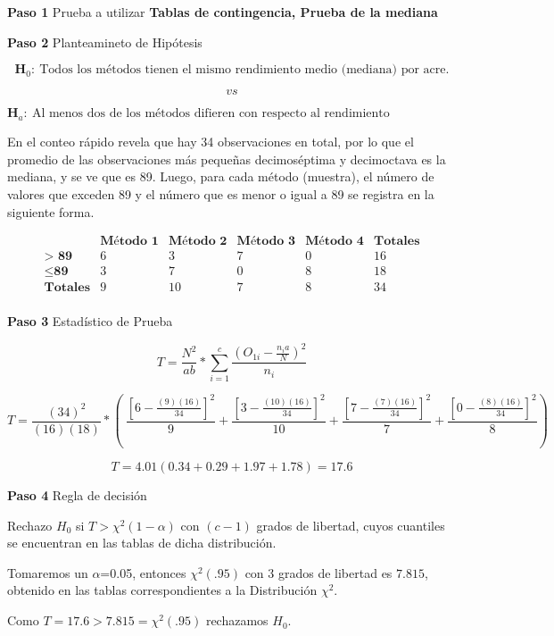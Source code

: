 \documentclass[
  a4paper,
  oneside,
  openany]{book}
\begin{document}
\textbf{Paso 1} Prueba a utilizar \textbf{Tablas de contingencia, Prueba de la mediana}

\textbf{Paso 2} Planteamineto de Hipótesis

\[\textbf{H}_0: \ \mbox{Todos los métodos tienen el mismo rendimiento medio (mediana) por acre.}\]

\[vs\]

\[\textbf{H}_a: \ \mbox{Al menos dos de los métodos difieren con respecto al rendimiento medio(mediana) por acre.}\]

En el conteo rápido revela que hay 34 observaciones en total, por lo que el promedio de las observaciones más pequeñas decimoséptima y decimoctava es la mediana, y se ve que es 89. Luego, para cada método (muestra), el número de valores que exceden 89 y el número que es menor o igual a 89 se registra en la siguiente forma.

\[
\begin{array}{c|c|c|c|c|c}
 & \textbf{Método 1} & \textbf{Método 2} & \textbf{Método 3} & \textbf{Método 4}& \textbf{Totales} \\
\hline
\textbf{> 89} & 6 & 3 & 7 & 0 & 16  \\
\hline
\leq \textbf{89} & 3 & 7 & 0 & 8 & 18\\
\hline
\textbf{Totales}  & 9  & 10  & 7 & 8  & 34 \\
\end{array}
\]

\textbf{Paso 3} Estadístico de Prueba

\[T=\frac{N^2}{ab}*\sum^{c}_{i=1}\frac{(O_{1i}-\frac{n_{i}a}{N})^2}{n_i}\]

\[T=\frac{(34)^2}{(16)(18)}*\left(\ \frac{\left[6-\frac{(9)(16)}{34}\right]^2}{9}+\frac{\left[3-\frac{(10)(16)}{34}\right]^2}{10}+\frac{\left[7-\frac{(7)(16)}{34}\right]^2}{7}+\frac{\left[0-\frac{(8)(16)}{34}\right]^2}{8} \right)\]

\[T=4.01(0.34+0.29+1.97+1.78) = 17.6\]

\textbf{Paso 4} Regla de decisión

Rechazo \(H_0\) si \(T> \chi^2(1-\alpha)\) con \((c-1)\) grados de libertad, cuyos cuantiles se encuentran en las tablas de dicha distribución.

Tomaremos un \(\alpha\)=0.05, entonces \(\chi^2(.95)\) con 3 grados de libertad es \(7.815\), obtenido en las tablas correspondientes a la Distribución \(\chi^2\).

Como \(T=17.6 > 7.815=\chi^2(.95)\) rechazamos \(H_0\).
\end{document}
